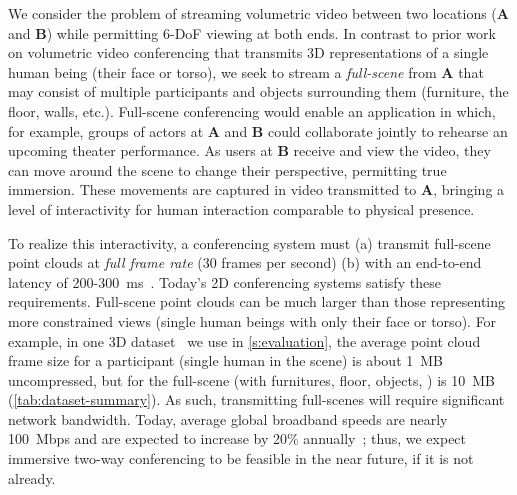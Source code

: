 %
We consider the problem of streaming volumetric video between two locations (\textbf{A} and \textbf{B}) while permitting 6-DoF viewing at both ends.
%
In contrast to prior work~\cite{starline,farfetchfusion,tele-aloha} on volumetric video conferencing that transmits 3D representations of a single human being (their face or torso), we seek to stream a \textit{full-scene} from \textbf{A} that may consist of multiple participants and objects surrounding them (\eg furniture, the floor, walls, etc.).
%
Full-scene conferencing would enable an application in which, for example, groups of actors at \textbf{A} and \textbf{B} could collaborate jointly to rehearse an upcoming theater performance.
%
As users at \textbf{B} receive and view the video, they can move around the scene to change their perspective, permitting true immersion.
%
%
These movements are captured in video transmitted to \textbf{A}, bringing a level of interactivity for human interaction comparable to physical presence.
%

To realize this interactivity, a conferencing system must
(a) transmit full-scene point clouds at \textit{full frame rate} (30 frames per second) (b) with an end-to-end latency of 200-300~ms~\cite{videoconf-benchmark,salsify,converge-sigcomm-2023,rfec-acm-mm2022}. 
%
Today's 2D conferencing systems satisfy these requirements.
%
Full-scene point clouds can be much larger than those representing more constrained views (single human beings with only their face or torso).
%
For example, in one 3D dataset~\cite{panoptic} we use in \cref{s:evaluation}, the average point cloud frame size for a participant (single human in the scene) is about 1~MB uncompressed, but for the full-scene (with furnitures, floor, objects, \etc) is 10~{MB} (\cref{tab:dataset-summary}).
%
As such, transmitting full-scenes will require significant network bandwidth.
%
Today, average global broadband speeds are nearly 100~Mbps and are expected to increase by 20\% annually~\cite{cisco_whitepaper}; thus, we expect immersive two-way conferencing to be feasible in the near future, if it is not already.

